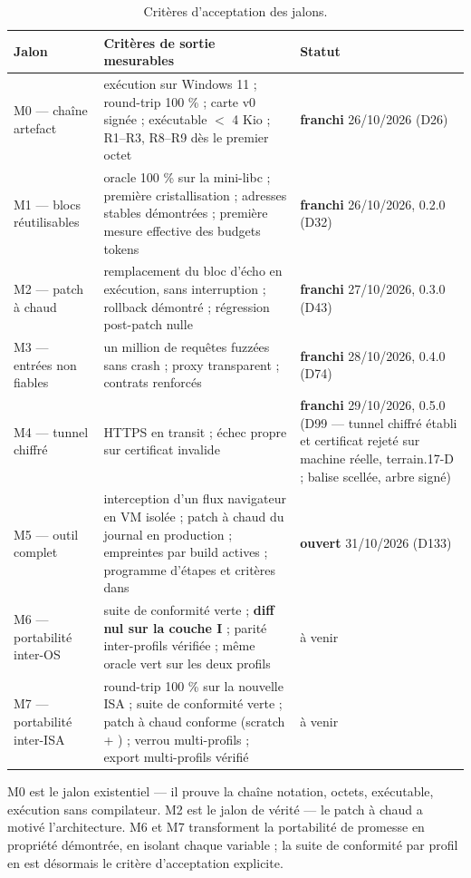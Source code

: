 \begin{table}[htbp]
\centering\small
\caption{Critères d'acceptation des jalons.}
\label{tab:jalons}
\begin{tabularx}{\textwidth}{@{}l Y >{\raggedright\arraybackslash}p{2.6cm}@{}}
\toprule
\textbf{Jalon} & \textbf{Critères de sortie mesurables} & \textbf{Statut} \\
\midrule
M0 — chaîne artefact & exécution sur Windows 11 ; round-trip 100 \% ; carte v0 signée ;
exécutable $<$ 4 Kio ; R1–R3, R8–R9 dès le premier octet & \textbf{franchi} 26/10/2026 (D26) \\
M1 — blocs réutilisables & oracle 100 \% sur la mini-libc ; première cristallisation ;
adresses stables démontrées ; première mesure effective des budgets tokens & \textbf{franchi} 26/10/2026, 0.2.0 (D32) \\
M2 — patch à chaud & remplacement du bloc d'écho en exécution, sans interruption ;
rollback démontré ; régression post-patch nulle & \textbf{franchi} 27/10/2026, 0.3.0 (D43) \\
M3 — entrées non fiables & un million de requêtes fuzzées sans crash ; proxy
transparent ; contrats renforcés & \textbf{franchi} 28/10/2026, 0.4.0 (D74) \\
M4 — tunnel chiffré & HTTPS en transit ; échec propre sur certificat invalide & \textbf{franchi} 29/10/2026, 0.5.0 (D99 — tunnel chiffré établi et certificat rejeté sur machine réelle, terrain.17-D ; balise scellée, arbre  signé) \\
M5 — outil complet & interception d'un flux navigateur en VM isolée ; patch à chaud du
journal en production ; empreintes par build actives ; programme d'étapes et critères
dans  & \textbf{ouvert} 31/10/2026 (D133) \\
M6 — portabilité inter-OS & suite de conformité verte ; \textbf{diff nul sur la couche
I} ; parité inter-profils vérifiée ; même oracle vert sur les deux profils & à venir \\
M7 — portabilité inter-ISA & round-trip 100 \% sur la nouvelle ISA ; suite de conformité
verte ; patch à chaud conforme (scratch + ) ; verrou multi-profils ; export
multi-profils vérifié & à venir \\
\bottomrule
\end{tabularx}
\end{table}

M0 est le jalon existentiel — il prouve la chaîne notation, octets, exécutable, exécution
sans compilateur. M2 est le jalon de vérité — le patch à chaud a motivé l'architecture.
M6 et M7 transforment la portabilité de promesse en propriété démontrée, en isolant chaque
variable ; la suite de conformité par profil en est désormais le critère d'acceptation
explicite.

